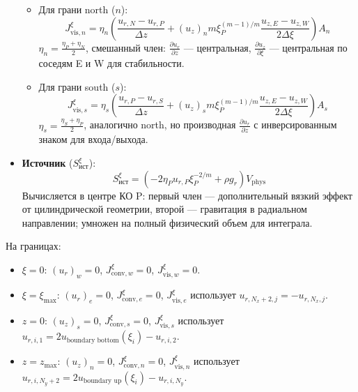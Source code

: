 \documentclass[a4paper,12pt]{article}
\begin{document}
\begin{itemize}
\begin{itemize}
        \item Для грани north (\(n\)):
        \[
        J_{\text{vis},n}^\xi = \eta_n \left( \frac{u_{r,N} - u_{r,P}}{\Delta z} + (u_z)_n m \xi_P^{(m-1)/m} \frac{u_{z,E} - u_{z,W}}{2 \Delta \xi} \right) A_n
        \]
        \(\eta_n = \frac{\eta_P + \eta_N}{2}\), смешанный член: \(\frac{\partial u_r}{\partial z}\) — центральная, \(\frac{\partial u_z}{\partial \xi}\) — центральная по соседям E и W для стабильности.

        \item Для грани south (\(s\)):
        \[
        J_{\text{vis},s}^\xi = \eta_s \left( \frac{u_{r,P} - u_{r,S}}{\Delta z} + (u_z)_s m \xi_P^{(m-1)/m} \frac{u_{z,E} - u_{z,W}}{2 \Delta \xi} \right) A_s
        \]
        \(\eta_s = \frac{\eta_S + \eta_P}{2}\), аналогично north, но производная \(\frac{\partial u_r}{\partial z}\) с инверсированным знаком для входа/выхода.
    \end{itemize}
    \item \textbf{Источник} (\(S_{\text{ист}}^\xi\)):
    \[
    S_{\text{ист}}^\xi = \left( -2 \eta_P u_{r,P} \xi_P^{-2/m} + \rho g_r \right) V_{\text{phys}}
    \]
    Вычисляется в центре КО P: первый член — дополнительный вязкий эффект от цилиндрической геометрии, второй — гравитация в радиальном направлении; умножен на полный физический объем для интеграла.
\end{itemize}
На границах:
\begin{itemize}
    \item \(\xi = 0\): \((u_r)_w = 0\), \(J_{\text{conv},w}^\xi = 0\), \(J_{\text{vis},w}^\xi = 0\).
    \item \(\xi = \xi_{\text{max}}\): \((u_r)_e = 0\), \(J_{\text{conv},e}^\xi = 0\), \(J_{\text{vis},e}^\xi\) использует \(u_{r,N_x+2,j} = -u_{r,N_x,j}\).
    \item \(z = 0\): \((u_z)_s = 0\), \(J_{\text{conv},s}^\xi = 0\), \(J_{\text{vis},s}^\xi\) использует \(u_{r,i,1} = 2 u_{\text{boundary bottom}}(\xi_i) - u_{r,i,2}\).
    \item \(z = z_{\text{max}}\): \((u_z)_n = 0\), \(J_{\text{conv},n}^\xi = 0\), \(J_{\text{vis},n}^\xi\) использует \(u_{r,i,N_y+2} = 2 u_{\text{boundary up}}(\xi_i) - u_{r,i,N_y}\).
\end{itemize}
\end{document}
